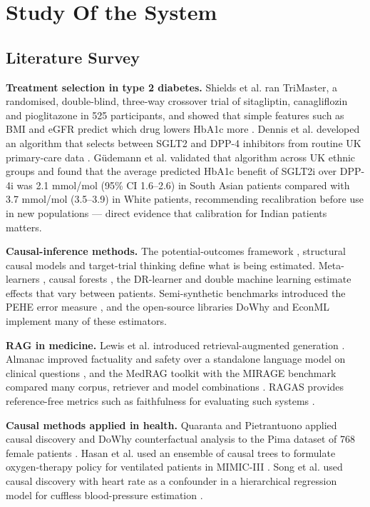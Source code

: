 \chapter{Study Of the System}\label{chap2}
\newpage
\section{Literature Survey}
\textbf{Treatment selection in type 2 diabetes.} Shields et al. ran TriMaster, a randomised, double-blind, three-way crossover trial of sitagliptin, canagliflozin and pioglitazone in 525 participants, and showed that simple features such as BMI and eGFR predict which drug lowers HbA1c more \cite{shields2023}. Dennis et al. developed an algorithm that selects between SGLT2 and DPP-4 inhibitors from routine UK primary-care data \cite{dennis2022}. G\"udemann et al. validated that algorithm across UK ethnic groups and found that the average predicted HbA1c benefit of SGLT2i over DPP-4i was 2.1 mmol/mol (95\% CI 1.6--2.6) in South Asian patients compared with 3.7 mmol/mol (3.5--3.9) in White patients, recommending recalibration before use in new populations \cite{gudemann2025} --- direct evidence that calibration for Indian patients matters.

\textbf{Causal-inference methods.} The potential-outcomes framework \cite{rubin1974}, structural causal models \cite{pearl2009} and target-trial thinking \cite{hernan2020,cashin2025} define what is being estimated. Meta-learners \cite{kunzel2019}, causal forests \cite{wager2018}, the DR-learner \cite{kennedy2023} and double machine learning \cite{chernozhukov2018} estimate effects that vary between patients. Semi-synthetic benchmarks introduced the PEHE error measure \cite{hill2011,shalit2017}, and the open-source libraries DoWhy \cite{dowhy} and EconML \cite{econml} implement many of these estimators.

\textbf{RAG in medicine.} Lewis et al. introduced retrieval-augmented generation \cite{lewis2020}. Almanac improved factuality and safety over a standalone language model on clinical questions \cite{zakka2024}, and the MedRAG toolkit with the MIRAGE benchmark compared many corpus, retriever and model combinations \cite{xiong2024}. RAGAS provides reference-free metrics such as faithfulness for evaluating such systems \cite{es2024}.

\textbf{Causal methods applied in health.} Quaranta and Pietrantuono applied causal discovery and DoWhy counterfactual analysis to the Pima dataset of 768 female patients \cite{quaranta2025}. Hasan et al. used an ensemble of causal trees to formulate oxygen-therapy policy for ventilated patients in MIMIC-III \cite{hasan2025}. Song et al. used causal discovery with heart rate as a confounder in a hierarchical regression model for cuffless blood-pressure estimation \cite{song2024}.


